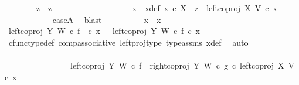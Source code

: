 \begin{isabellebody}
\ \ \ \ \ \ \isamarkupfalse%
\ {\isachardoublequoteopen}z{}\ {\isacharequal}{\kern0pt}\ z{}{\isachardoublequoteclose}\isanewline
\ \ \ \ \ \ \isamarkupfalse%
\ {\isacharminus}{\kern0pt}\ \isanewline
\ \ \ \ \ \ \ \ \isamarkupfalse%
\ x{}\ \ x{}{\isacharunderscore}{\kern0pt}def{\isacharcolon}{\kern0pt}\ {\isachardoublequoteopen}x{}\ {\isasymin}\isactrlsub c\ X\ {\isasymand}\ z{}\ {\isacharequal}{\kern0pt}\ left{\isacharunderscore}{\kern0pt}coproj\ X\ V\ {\isasymcirc}\isactrlsub c\ x{}{\isachardoublequoteclose}\isanewline
\ \ \ \ \ \ \ \ \ \ \isamarkupfalse%
\ caseA\ \isamarkupfalse%
\ blast\isanewline
\ \ \ \ \ \ \ \ \isamarkupfalse%
\ {\isachardoublequoteopen}x{}\ {\isacharequal}{\kern0pt}\ x{}{\isachardoublequoteclose}\isanewline
\ \ \ \ \ \ \ \ \isamarkupfalse%
\ {\isacharminus}{\kern0pt}\ \isanewline
\ \ \ \ \ \ \ \ \ \ \isamarkupfalse%
\ {\isachardoublequoteopen}left{\isacharunderscore}{\kern0pt}coproj\ Y\ W\ {\isasymcirc}\isactrlsub c\ f\ \ {\isasymcirc}\isactrlsub c\ x{}\ \ {\isacharequal}{\kern0pt}\ {\isacharparenleft}{\kern0pt}left{\isacharunderscore}{\kern0pt}coproj\ Y\ W\ {\isasymcirc}\isactrlsub c\ f{\isacharparenright}{\kern0pt}\ {\isasymcirc}\isactrlsub c\ x{}{\isachardoublequoteclose}\isanewline
\ \ \ \ \ \ \ \ \ \ \ \ \isamarkupfalse%
\ cfunc{\isacharunderscore}{\kern0pt}type{\isacharunderscore}{\kern0pt}def\ comp{\isacharunderscore}{\kern0pt}associative\ left{\isacharunderscore}{\kern0pt}proj{\isacharunderscore}{\kern0pt}type\ type{\isacharunderscore}{\kern0pt}assms{\isacharparenleft}{\kern0pt}{}{\isacharparenright}{\kern0pt}\ x{}{\isacharunderscore}{\kern0pt}def\ \isamarkupfalse%
\ auto\ \ \ \ \ \ \ \ \ \ \ \ \isanewline
\ \ \ \ \ \ \ \ \ \ \isamarkupfalse%
\ \isamarkupfalse%
\ {\isachardoublequoteopen}{\isachardot}{\kern0pt}{\isachardot}{\kern0pt}{\isachardot}{\kern0pt}\ {\isacharequal}{\kern0pt}\ \isanewline
\ \ \ \ \ \ \ \ \ \ \ \ \ \ \ \ {\isacharparenleft}{\kern0pt}{\isacharparenleft}{\kern0pt}{\isacharparenleft}{\kern0pt}left{\isacharunderscore}{\kern0pt}coproj\ Y\ W\ {\isasymcirc}\isactrlsub c\ f{\isacharparenright}{\kern0pt}\ {\isasymamalg}\ {\isacharparenleft}{\kern0pt}right{\isacharunderscore}{\kern0pt}coproj\ Y\ W\ {\isasymcirc}\isactrlsub c\ g{\isacharparenright}{\kern0pt}{\isacharparenright}{\kern0pt}\ {\isasymcirc}\isactrlsub c\ left{\isacharunderscore}{\kern0pt}coproj\ X\ V{\isacharparenright}{\kern0pt}\ {\isasymcirc}\isactrlsub c\ x{}{\isachardoublequoteclose}\isanewline

\end{isabellebody}
